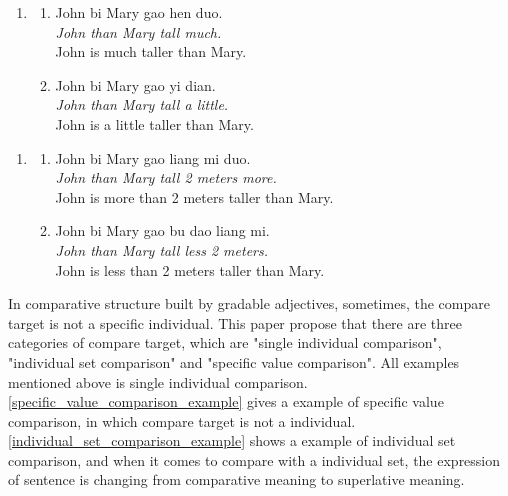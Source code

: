 \documentclass{ctexart}
\begin{document}
\begin{enumerate}[resume]
    \item
    \begin{enumerate}[ref=(\arabic{enumi}\alph*)]
        \item \label{dp_big_vague_example}
        John bi Mary gao hen duo.\\
        \textit{John than Mary tall much.} \\
        John is much taller than Mary.

        \item \label{dp_small_vague_example}
        John bi Mary gao yi dian.\\
        \textit{John than Mary tall a little.}\\
        John is a little taller than Mary.

    \end{enumerate}
\end{enumerate}

\begin{enumerate}[resume]
    \item
    \begin{enumerate}[ref=(\arabic{enumi}\alph*)]
        \item \label{dp_value_big_vague_example}
        John bi Mary gao liang mi duo.\\
        \textit{John than Mary tall 2 meters more.} \\
        John is more than 2 meters taller than Mary.

        \item \label{dp_value_small_vague_example}
        John bi Mary gao bu dao liang mi.\\
        \textit{John than Mary tall less 2 meters.} \\
        John is less than 2 meters taller than Mary.
    \end{enumerate}
\end{enumerate}

In comparative structure built by gradable adjectives, sometimes, the compare target is not a specific individual. This paper propose that there are three categories of compare target, which are "single individual comparison", "individual set comparison" and "specific value comparison". All examples mentioned above is single individual comparison. \ref{specific_value_comparison_example} gives a example of specific value comparison, in which compare target is not a individual. \ref{individual_set_comparison_example} shows a example of individual set comparison, and when it comes to compare with a individual set, the expression of sentence is changing from comparative meaning to superlative meaning.
\end{document}
